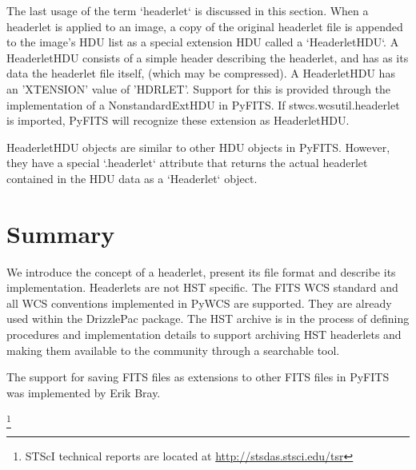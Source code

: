 The last usage of the term `headerlet` is discussed in this section.
When a headerlet is applied to an image, a copy of the original 
headerlet file is appended to the image's HDU list as a special extension
HDU called a `HeaderletHDU`. A HeaderletHDU consists of a simple header
describing the headerlet, and has as its data the headerlet file itself,
(which may be compressed). A HeaderletHDU has an 'XTENSION' 
value of 'HDRLET'. Support for this is provided through the implementation
of a NonstandardExtHDU in PyFITS. If stwcs.wcsutil.headerlet is imported,
PyFITS will recognize these extension as HeaderletHDU.

HeaderletHDU objects are similar to other HDU objects in PyFITS.
However, they have a special `.headerlet` attribute that returns
the actual headerlet contained in the HDU data as a `Headerlet` object.

\section{Summary}
We introduce the concept of a headerlet, present its file format
and describe its implementation. Headerlets are not HST specific.
The FITS WCS standard and all WCS conventions implemented in PyWCS
are supported. They are already used within the DrizzlePac package. 
The HST archive is in the process of defining procedures and 
implementation details to support archiving HST headerlets and making
them available to the community through a searchable tool.

\acknowledgements The support for saving FITS files as extensions to other FITS files in PyFITS was implemented by Erik Bray.

\footnote{STScI technical reports are located at \url{http://stsdas.stsci.edu/tsr}}

 
